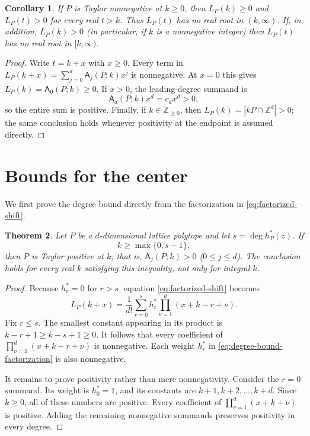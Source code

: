 \documentclass[reqno, 12pt]{article}
\numberwithin{equation}{section}
\newtheorem{theorem}{Theorem}[section]
\newtheorem{corollary}[theorem]{Corollary}
\theoremstyle{definition}
\newcommand{\Z}{\mathbb{Z}}
\newcommand{\N}{\mathbb{Z}_{\geq 0}}
\newcommand{\A}{\mathsf{A}}
\begin{document}
\begin{corollary}\label{cor:root-free}
If $P$ is Taylor nonnegative at $k\geq0$, then $L_P(k)\geq0$ and $L_P(t)>0$ for every real $t>k$. 
Thus $L_P(t)$ has no real root in $(k,\infty)$.  
If, in addition, $L_P(k)>0$ (in particular, if $k$ is a nonnegative integer)
then $L_P(t)$ has no real root in $[k,\infty)$.
\end{corollary}
\begin{proof}
Write $t=k+x$ with $x\geq0$.  Every term in $L_P(k+x)=\sum_{j=0}^{d}\A_j(P;k)x^j$
is nonnegative.  At $x=0$ this gives $L_P(k)=\A_0(P;k)\geq0$.  If $x>0$,
the leading-degree summand is
\[\A_d(P;k)x^d=c_dx^d>0,
\]
so the entire sum is positive.  Finally, if $k\in\N$, then
$L_P(k)=|kP\cap\Z^d|>0$; the same conclusion holds whenever positivity at
the endpoint is assumed directly.
\end{proof}

\section{Bounds for the center}
\label{sec:bounds}

We first prove the degree bound directly from the factorization in \eqref{eq:factorized-shift}.

\begin{theorem}\label{thm:degree-bound}
Let $P$ be a $d$-dimensional lattice polytope and let $s=\deg h_P^*(z)$.  If
\[k\geq\max\{0,s-1\},
\]
then $P$ is Taylor positive at $k$; that is, $\A_j(P;k)>0$ ($0\leq j\leq d$).
The conclusion holds for every real $k$ satisfying this inequality, not only for integral $k$.
\end{theorem}
\begin{proof}
Because $h_r^*=0$ for $r>s$, equation \eqref{eq:factorized-shift} becomes
\begin{equation}\label{eq:degree-bound-factorization}
 L_P(k+x) =\frac1{d!}\sum_{r=0}^{s}h_r^*\prod_{\nu=1}^{d}(x+k-r+\nu).
\end{equation}
Fix $r\leq s$. The smallest constant appearing in its product is $k-r+1\geq k-s+1\geq0$.
It follows that every coefficient of $\prod_{\nu=1}^{d}(x+k-r+\nu)$ is nonnegative.
Each weight $h_r^*$ in \eqref{eq:degree-bound-factorization} is also nonnegative.

It remains to prove positivity rather than mere nonnegativity.
Consider the $r=0$ summand.  Its weight is $h_0^*=1$, and its constants are $k+1,k+2,\ldots,k+d$.
Since $k\geq0$, all of these numbers are positive.  Every coefficient of $\prod_{\nu=1}^{d}(x+k+\nu)$ is positive.  Adding the remaining nonnegative summands preserves positivity in every degree.
\end{proof}
\end{document}

